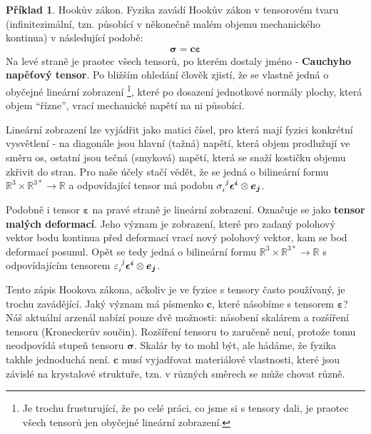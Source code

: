 \documentclass[a5paper,12pt]{amsbook}
\theoremstyle{definition}
\newtheorem{example}{Příklad}[chapter]
\newcommand{\myvec}[1]{\bm{#1}}
\newcommand{\myspace}[1]{\mathbb{#1}}
\begin{document}
\begin{example}
Hookův zákon. Fyzika zavádí Hookův zákon v tensorovém tvaru (infinitezimální, tzn. působící
v někonečně malém objemu mechanického kontinua) v následující podobě:
\begin{equation*}
\begin{split}
\myvec{\sigma} = \myvec{c}\myvec{\varepsilon}
\end{split}
\end{equation*}
Na levé straně je praotec všech tensorů, po kterém dostaly jméno - \textbf{Cauchyho
napěťový tensor}. Po bližším ohledání člověk zjistí, že se vlastně jedná o obyčejné
lineární zobrazení \footnote{Je trochu frusturující, že po celé práci, co jsme
si s tensory dali, je praotec všech tensorů jen obyčejné lineární zobrazení.},
které po dosazení jednotkové normály plochy, která objem ``řízne'', vrací mechanické
napětí na ni působící.

Lineární zobrazení lze vyjádřit jako matici čísel, pro která mají fyzici konkrétní
vysvětlení - na diagonále jsou hlavní (tažná) napětí, která objem prodlužují ve směru
os, ostatní jsou tečná (smyková) napětí, která se snaží kostičku objemu zkřivit
do stran. Pro naše účely stačí vědět, že se jedná o bilineární formu
$\myspace{R}^{3}\times\myspace{R}^{3*}\rightarrow\myspace{R}$ a odpovídající tensor
má podobu $\sigma\indices{_i^j}\myvec{\epsilon^i}\otimes\myvec{e_j}$.

Podobně i tensor $\myvec{\varepsilon}$ na pravé straně je lineární zobrazení.
Označuje se jako \textbf{tensor malých deformací}. Jeho význam je zobrazení,
které pro zadaný polohový vektor bodu kontinua před deformací vrací nový polohový
vektor, kam se bod deformací posunul. Opět se tedy jedná o bilineární formu
$\myspace{R}^{3}\times\myspace{R}^{3*}\rightarrow\myspace{R}$ s odpovídajícím
tensorem $\varepsilon\indices{_i^j}\myvec{\epsilon^i}\otimes\myvec{e_j}$.

Tento zápis Hookova zákona, ačkoliv je ve fyzice s tensory často používaný,
je trochu zavádějící. Jaký význam má písmenko $\myvec{c}$, které násobíme
s tensorem $\myvec{\varepsilon}$? Náš aktuální arzenál nabízí pouze dvě možnosti:
násobení skalárem a rozšíření tensoru (Kroneckerův součin). Rozšíření
tensoru to zaručeně není, protože tomu neodpovídá stupeň tensoru $\myvec{\sigma}$.
Skalár by to mohl být, ale hádáme, že fyzika takhle jednoduchá není. $\myvec{c}$
musí vyjadřovat materiálové vlastnosti, které jsou závislé na krystalové struktuře,
tzn. v různých směrech se může chovat různě.


\end{example}
\end{document}
